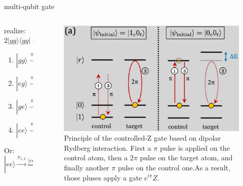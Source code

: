\documentclass[18 pt]{beamer}
\begin{document}
\begin{frame}{multi-qubit gate}
  \begin{columns}
    \begin{column}{.5\textwidth}
      realize: \(2|gg\rangle\langle gg|-\mathbb{I} \)
      \vspace{20pt}
      \begin{enumerate}[itemsep=15pt]
        \item \(|gg\rangle\xrightarrow{\pi_1} |gg\rangle \xrightarrow{2\pi_2} |gg\rangle \xrightarrow{\pi_1} |gg\rangle\)
        \item \(|eg\rangle\xrightarrow{\pi_1} |rg\rangle \xrightarrow{2\pi_2} |rg\rangle \xrightarrow{\pi_1} -|eg\rangle \)
        \item \(|ge\rangle\xrightarrow{\pi_1} |ge\rangle \xrightarrow{2\pi_2} -|ge\rangle \xrightarrow{\pi_1} -|ge\rangle \)
        \item \(|ee\rangle\xrightarrow{\pi_1} |re\rangle \xrightarrow{2\pi_2} |re\rangle  \xrightarrow{\pi_1} -|ee\rangle \)
      \end{enumerate}
      \vspace{20pt}
      Or: \(|ee\rangle \xrightarrow{\pi_{1,2}} \frac{|er\rangle+|re\rangle}{\sqrt{2}} \xrightarrow{\pi_{1,2}} -|ee\rangle\)
    \end{column}
    \begin{column}{.5\textwidth}
      \begin{figure}
        \includegraphics[width=\textwidth]{IMG/cz.png}
        \caption{Principle of the controlled-Z gate based on dipolar Rydberg interaction. First a $\pi$ pulse is applied on the control atom, then a 2$\pi$ pulse on the target atom, and finally another $\pi$ pulse on the control one.As a result, those pluses apply a gate $e^{i\pi} Z$.}
      \end{figure}
    \end{column}
  \end{columns}
\end{frame}
\end{document}
